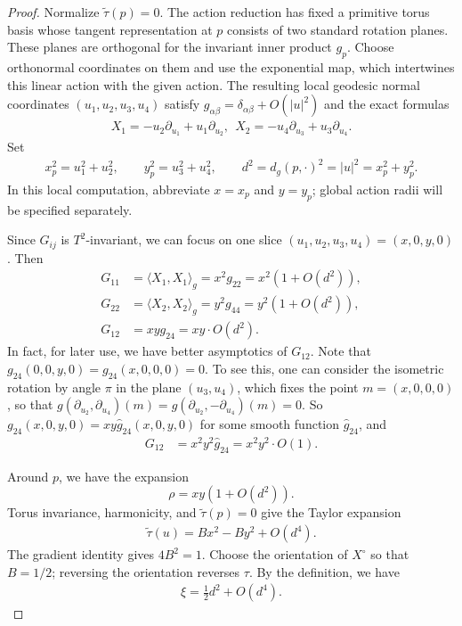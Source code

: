 \documentclass[letterpaper]{amsart}
\theoremstyle{definition}
\theoremstyle{remark}
\begin{document}
\begin{proof}
Normalize $\tilde\tau(p)=0$. The action reduction has fixed a primitive torus basis whose tangent representation at $p$ consists of two standard rotation planes. These planes are orthogonal for the invariant inner product $g_p$. Choose orthonormal coordinates on them and use the exponential map, which intertwines this linear action with the given action. The resulting local geodesic normal coordinates $(u_1,u_2,u_3,u_4)$ satisfy $g_{\alpha\beta}=\delta_{\alpha\beta}+O(|u|^2)$ and the exact formulas
\begin{align*}
	X_1 = - u_2 \partial _{u_1} + u_1 \partial _{u_2},\ \ X_2= - u_4 \partial _{u_3}+ u_3 \partial _{u_4}.
\end{align*} 
Set
\begin{align*}
	x_p^2=u_1^2+u_2^2,\qquad y_p^2=u_3^2+u_4^2,\qquad d^2=d_g(p,\cdot)^2=|u|^2=x_p^2+y_p^2.
\end{align*} 
In this local computation, abbreviate $x=x_p$ and $y=y_p$; global action radii will be specified separately.

Since $G_{ij}$ is $T^2$-invariant, we can focus on one slice $(u_1, u_2, u_3, u_4) = (x, 0, y, 0)$. Then 
\begin{align*}
	G_{11} &= \langle X_1, X_1 \rangle_g = x ^2 g_{22} = x ^2(1+ O(d ^2) ),\\
	G_{22} &= \langle X_2, X_2 \rangle_g = y ^2 g_{44} = y ^2(1+ O(d ^2) ),\\
	G_{12} &= x y g_{2 4} = x y \cdot  O(d ^2).
\end{align*} 
In fact, for later use, we have better asymptotics of $G_{12}$. Note that $g_{24}(0, 0, y, 0) = g_{24}(x, 0, 0, 0)=0$. To see this, one can consider the isometric rotation by angle $\pi $ in the plane $(u_3, u_4)$, which fixes the point $m=(x, 0,0,0)$, so that $g(\partial _{u_2}, \partial _{u_4})(m) = g(\partial _{u_2}, -\partial _{u_4})(m) = 0$. So $g_{24}(x,0, y, 0) = x y \hat{g}_{24}(x,0, y, 0)$ for some smooth function $\hat{g}_{24}$, and
\begin{align*}
	G_{12} &= x ^2 y ^2 \hat{g}_{24} = x ^2 y ^2 \cdot O(1).
\end{align*} 

Around $p$, we have the expansion 
$$\rho = x y (1+ O(d ^2) ).$$
Torus invariance, harmonicity, and $\tilde\tau(p)=0$ give the Taylor expansion
\begin{align*}
	\tilde{\tau } (u) = B x ^2 - B y ^2 + O(d ^4).
\end{align*} 
The gradient identity gives $4B^2=1$. Choose the orientation of $X^\circ$ so that $B=1/2$; reversing the orientation reverses $\tau$. By the definition, we have
\begin{align*}
	\xi  = \frac{1}{2} d ^2 + O(d ^{4}).
\end{align*} 

\end{proof}
\end{document}
